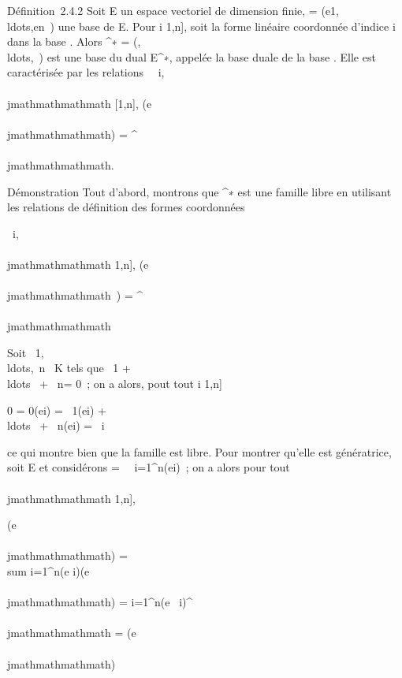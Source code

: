 Définition~2.4.2 Soit E un espace vectoriel de dimension finie,  =
(e1,\\ldots,en~)
une base de E. Pour i \in {[}1,n{]}, soit \phii la forme linéaire
coordonnée d'indice i dans la base . Alors ^∗ =
(,\\ldots,\phin~)
est une base du dual E^∗, appelée la base duale de la base .
Elle est caractérisée par les relations \forall~~i,\\\\jmathmathmathmath \in
{[}1,n{]}, \phii(e\\\\jmathmathmathmath) = \deltai^\\\\jmathmathmathmath.

Démonstration Tout d'abord, montrons que ^∗ est une famille
libre en utilisant les relations de définition des formes coordonnées

\forall~i,\\\\jmathmathmathmath \in {[}1,n{]}, \phii(e\\\\jmathmathmathmath~) =
\deltai^\\\\jmathmathmathmath

Soit
\lambda~1,\\ldots,\lambda~n~
\in K tels que \lambda~1 +
\\ldots~ +
\lambda~n\phin = 0~; on a alors, pout tout i \in {[}1,n{]}

0 = 0(ei) = \lambda~1(ei) +
\\ldots~ +
\lambda~n\phin(ei) = \lambda~i

ce qui montre bien que la famille est libre. Pour montrer qu'elle est
génératrice, soit \phi \in E et considérons \psi =\
\sum ~
i=1^n\phi(ei)\phii~; on a alors pour tout \\\\jmathmathmathmath
\in {[}1,n{]},

\psi(e\\\\jmathmathmathmath) = \\sum
i=1^n\phi(e i)\phii(e\\\\jmathmathmathmath) =
\sum i=1^n\phi(e~
i)\deltai^\\\\jmathmathmathmath = \phi(e \\\\jmathmathmathmath)

